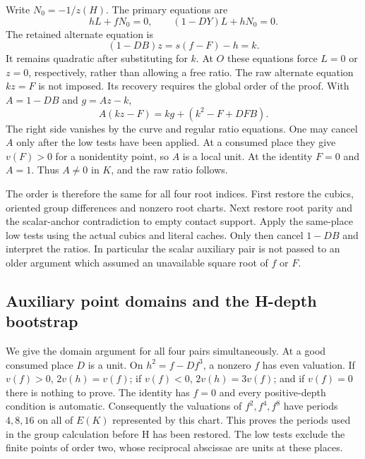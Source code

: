 Write $N_0=-1/z(H)$. The primary equations are
\begin{equation}\label{eq:v14-primary-ratios}
 hL+fN_0=0,\qquad (1-DY)L+hN_0=0.
\end{equation}
The retained alternate equation is
\begin{equation}\label{eq:v14-regular-ratio}
 (1-DB)z=s(f-F)-h=k.
\end{equation}
It remains quadratic after substituting for $k$.
At $O$ these equations force $L=0$ or $z=0$, respectively,
rather than allowing a free ratio. The raw alternate equation
$kz=F$ is not imposed. Its recovery requires the global order of
the proof. With $A=1-DB$ and $g=Az-k$,
\begin{equation}\label{eq:v14-raw-ratio}
 A(kz-F)=kg+(k^2-F+DFB).
\end{equation}
The right side vanishes by the curve and regular ratio equations.
One may cancel $A$ only after the low tests have been applied.
At a consumed place they give $v(F)>0$ for a nonidentity point,
so $A$ is a local unit. At the identity $F=0$ and $A=1$.
Thus $A\ne0$ in $K$, and the raw ratio follows.

The order is therefore the same for all four root indices.
First restore the cubics, oriented group differences and nonzero
root charts. Next restore root parity and the scalar-anchor
contradiction to empty contact support. Apply the same-place low
tests using the actual cubics and literal caches. Only then
cancel $1-DB$ and interpret the ratios. In particular the scalar
auxiliary pair is not passed to an older argument which assumed
an unavailable square root of $f$ or $F$.

\subsection{Auxiliary point domains and the H-depth bootstrap}
\label{subsec:v14-logarithms}
We give the domain argument for all four pairs simultaneously.
At a good consumed place $D$ is a unit. On
$h^2=f-Df^3$, a nonzero $f$ has even valuation. If $v(f)>0$,
$2v(h)=v(f)$; if $v(f)<0$, $2v(h)=3v(f)$; and if $v(f)=0$
there is nothing to prove. The identity has $f=0$ and every
positive-depth condition is automatic. Consequently the
valuations of $f^2,f^4,f^8$ have periods $4,8,16$ on all of
$E(K)$ represented by this chart. This proves the periods used
in the group calculation before H has been restored.
The low tests exclude the finite points of order two, whose
reciprocal abscissae are units at these places.


